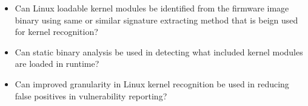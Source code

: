 \begin{itemize}

\item Can Linux loadable kernel modules be identified from the firmware image binary using same or
    similar signature extracting method that is beign used for kernel recognition?

\item Can static binary analysis be used in detecting what included kernel modules are loaded in runtime?

\item Can improved granularity in Linux kernel recognition be used in reducing false positives in
    vulnerability reporting?

\end{itemize}
